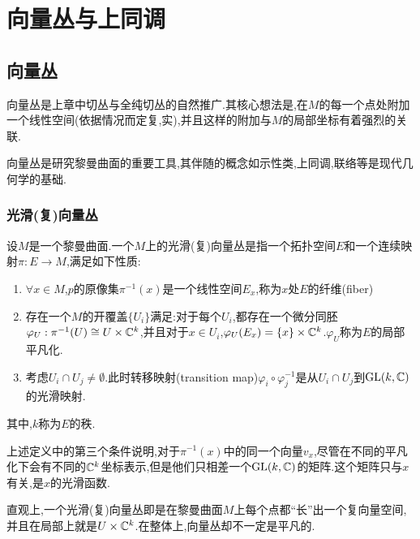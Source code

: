 \ifx\allfiles\undefined

	
	
\else
\fi
\chapter{向量丛与上同调}
\section{向量丛}
向量丛是上章中切丛与全纯切丛的自然推广.其核心想法是,在$M$的每一个点处附加一个线性空间(依据情况而定复,实),并且这样的附加与$M$的局部坐标有着强烈的关联.

向量丛是研究黎曼曲面的重要工具,其伴随的概念如示性类,上同调,联络等是现代几何学的基础.
\subsection*{光滑(复)向量丛}
\begin{definition}
	设$M$是一个黎曼曲面.一个$M$上的光滑(复)向量丛是指一个拓扑空间$E$和一个连续映射$\pi:E \to M$,满足如下性质:
	\begin{enumerate}
		\item $\forall x\in M$,$p$的原像集$\pi^{-1}(x)$是一个线性空间$E_x$,称为$x$处$E$的纤维(fiber)
		\item 存在一个$M$的开覆盖$\{U_i\}$满足:对于每个$U_i$,都存在一个微分同胚$\varphi_U:\pi^{-1}(U)\cong U\times \mathbb{C}^k$,并且对于$x \in U_i$,$\varphi_U(E_x)=\{x\}\times \mathbb{C}^k$.$\varphi_U$称为$E$的局部平凡化.
		\item 考虑$U_i\cap U_j\neq \emptyset$.此时转移映射(transition map)$\varphi_i \circ \varphi_j^{-1}$是从$U_i\cap U_j$到$\mathrm{GL}(k,\mathbb{C})$的光滑映射.
	\end{enumerate}
	其中,$k$称为$E$的秩.
\end{definition}
上述定义中的第三个条件说明,对于$\pi^{-1}(x)$中的同一个向量$v_x$,尽管在不同的平凡化下会有不同的$\mathbb{C}^k$坐标表示,但是他们只相差一个$\mathrm{GL}(k,\mathbb{C})$的矩阵.这个矩阵只与$x$有关,是$x$的光滑函数.

直观上,一个光滑(复)向量丛即是在黎曼曲面$M$上每个点都“长”出一个复向量空间,并且在局部上就是$U\times \mathbb{C}^k$.在整体上,向量丛却不一定是平凡的.

